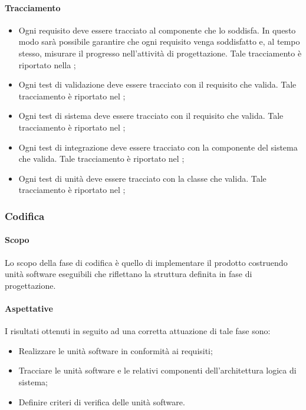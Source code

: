 \documentclass[../NormeDiProgetto.tex]{subfiles}
\begin{document}
			\paragraph{Tracciamento}  
			\begin{itemize}
				\item Ogni requisito deve essere tracciato al componente che lo soddisfa. In questo modo sarà possibile garantire che ogni requisito venga soddisfatto e,
				al tempo stesso, misurare il progresso nell’attività di progettazione. Tale tracciamento è riportato nella \specificatecnica;
				\item Ogni test di validazione deve essere tracciato con il requisito che valida. Tale tracciamento è riportato nel \pianodiqualifica;
				\item Ogni test di sistema deve essere tracciato con il requisito che valida. Tale tracciamento è riportato nel \pianodiqualifica;
				\item Ogni test di integrazione deve essere tracciato con la componente del sistema che valida. Tale tracciamento è riportato nel \pianodiqualifica;
				\item Ogni test di unità deve essere tracciato con la classe che valida. Tale tracciamento è riportato nel \pianodiqualifica;
			\end{itemize}
		
		
		\subsubsection{Codifica}
			\paragraph{Scopo\\}
				Lo scopo della fase di codifica è quello di implementare il prodotto costruendo
				unità software eseguibili che riflettano la struttura definita in fase di
				progettazione.
			\paragraph{Aspettative\\}
				I risultati ottenuti in seguito ad una corretta attuazione di tale fase sono:
				\begin{itemize}
					\item Realizzare le unità software in conformità ai requisiti;
					\item Tracciare le unità software e le relativi componenti dell'architettura
					logica di sistema;
					\item Definire criteri di verifica delle unità software.
				\end{itemize}
\end{document}
